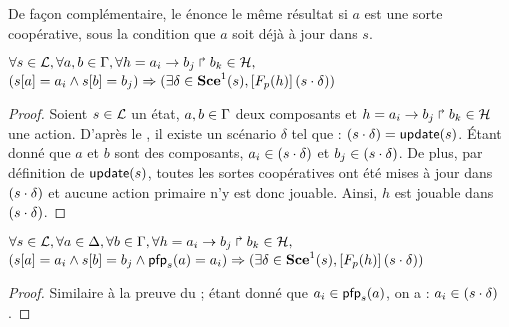 De façon complémentaire, le  énonce le même résultat si $a$ est une sorte coopérative,
sous la condition que $a$ soit déjà à jour dans $s$.

\begin{lemma}
  $\forall s \in \mathcal{L}, \forall a,b \in \mathrm{\Gamma}, \forall h = a_i\rightarrow b_j\Rsh b_k \in \mathcal{H},$\\
  $({s[a]} = a_i \wedge {s[b]} = b_j) \Rightarrow
    (\exists \delta \in \mathbf{Sce}^1(s),
    \left[F_{p}(h)\right](s \cdot \delta))$
\end{lemma}

\begin{proof} %
  Soient $s \in \mathcal{L}$ un état, $a,b \in \mathrm{\Gamma}$ deux composants et
  $h = a_i\rightarrow b_j\Rsh b_k \in \mathcal{H}$ une action.
  D'après le , il existe un scénario $\delta$ tel que :
  $(s \cdot \delta) = \mathsf{update}(s)$.
  Étant donné que $a$ et $b$ sont des composants,
  $a_i \in (s \cdot \delta)$ et $b_j \in (s \cdot \delta)$.
  De plus, par définition de $\mathsf{update}(s)$,
  toutes les sortes coopératives ont été mises à jour dans $(s \cdot \delta)$
  et aucune action primaire n'y est donc jouable.
  Ainsi, $h$ est jouable dans $(s \cdot \delta)$.
\end{proof}

\begin{lemma}
  $\forall s \in \mathcal{L}, \forall a \in \Delta, \forall b \in \mathrm{\Gamma},
    \forall h = a_i\rightarrow b_j\Rsh b_k \in \mathcal{H},$\\
  $({s[a]} = a_i \wedge {s[b]} = b_j \wedge \mathsf{pfp}_s(a) = a_i) \Rightarrow
    (\exists \delta \in \mathbf{Sce}^1(s),
    \left[F_{p}(h)\right](s \cdot \delta))$
\end{lemma}

\begin{proof} %
  Similaire à la preuve du  ;
  étant donné que $a_i \in \mathsf{pfp}_s(a)$, on a : $a_i \in (s \cdot \delta)$.
\end{proof}
